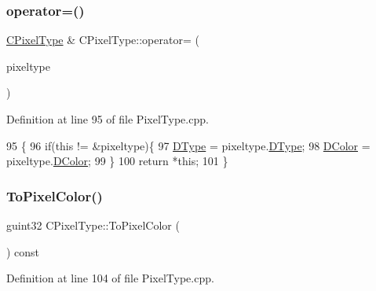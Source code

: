 \subsubsection{\texorpdfstring{operator=()}{operator=()}}
{\footnotesize\ttfamily \hyperlink{classCPixelType}{C\+Pixel\+Type} \& C\+Pixel\+Type\+::operator= (\begin{DoxyParamCaption}\item[{const \hyperlink{classCPixelType}{C\+Pixel\+Type} \&}]{pixeltype }\end{DoxyParamCaption})}



Definition at line 95 of file Pixel\+Type.\+cpp.


\begin{DoxyCode}
95                                                             \{
96     \textcolor{keywordflow}{if}(\textcolor{keyword}{this} != &pixeltype)\{
97         \hyperlink{classCPixelType_aca37f042b510a349e0d3209c73ae51c5}{DType} = pixeltype.\hyperlink{classCPixelType_aca37f042b510a349e0d3209c73ae51c5}{DType};
98         \hyperlink{classCPixelType_a474243cf748aee94cfa207659e940b6c}{DColor} = pixeltype.\hyperlink{classCPixelType_a474243cf748aee94cfa207659e940b6c}{DColor};   
99     \}
100     \textcolor{keywordflow}{return} *\textcolor{keyword}{this};
101 \}
\end{DoxyCode}
\hypertarget{classCPixelType_abdad3e51c47f410745f7795931798cb3}{}\label{classCPixelType_abdad3e51c47f410745f7795931798cb3} 
\subsubsection{\texorpdfstring{To\+Pixel\+Color()}{ToPixelColor()}}
{\footnotesize\ttfamily guint32 C\+Pixel\+Type\+::\+To\+Pixel\+Color (\begin{DoxyParamCaption}{ }\end{DoxyParamCaption}) const}



Definition at line 104 of file Pixel\+Type.\+cpp.


